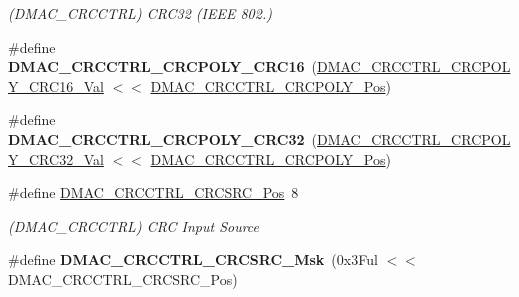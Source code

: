 \begin{DoxyCompactItemize}
\begin{DoxyCompactList}\small\item\em (D\+M\+A\+C\+\_\+\+C\+R\+C\+C\+T\+R\+L) C\+R\+C32 (I\+E\+E\+E 802.) \end{DoxyCompactList}\item 
\hypertarget{group___s_a_m_l21___d_m_a_c_ga471087616e9f20ccadbf347424f80de0}{}\#define {\bfseries D\+M\+A\+C\+\_\+\+C\+R\+C\+C\+T\+R\+L\+\_\+\+C\+R\+C\+P\+O\+L\+Y\+\_\+\+C\+R\+C16}~(\hyperlink{group___s_a_m_l21___d_m_a_c_gab7a571f0737b3094278178b68b70b75f}{D\+M\+A\+C\+\_\+\+C\+R\+C\+C\+T\+R\+L\+\_\+\+C\+R\+C\+P\+O\+L\+Y\+\_\+\+C\+R\+C16\+\_\+\+Val} $<$$<$ \hyperlink{group___s_a_m_l21___d_m_a_c_ga97c64ee6ae79fa28bef8e734380d31ee}{D\+M\+A\+C\+\_\+\+C\+R\+C\+C\+T\+R\+L\+\_\+\+C\+R\+C\+P\+O\+L\+Y\+\_\+\+Pos})\label{group___s_a_m_l21___d_m_a_c_ga471087616e9f20ccadbf347424f80de0}

\item 
\hypertarget{group___s_a_m_l21___d_m_a_c_gaa69d1bd9b5d9651b468708185004b1fa}{}\#define {\bfseries D\+M\+A\+C\+\_\+\+C\+R\+C\+C\+T\+R\+L\+\_\+\+C\+R\+C\+P\+O\+L\+Y\+\_\+\+C\+R\+C32}~(\hyperlink{group___s_a_m_l21___d_m_a_c_ga227b0d7a03589588e6f3234fba814b5a}{D\+M\+A\+C\+\_\+\+C\+R\+C\+C\+T\+R\+L\+\_\+\+C\+R\+C\+P\+O\+L\+Y\+\_\+\+C\+R\+C32\+\_\+\+Val} $<$$<$ \hyperlink{group___s_a_m_l21___d_m_a_c_ga97c64ee6ae79fa28bef8e734380d31ee}{D\+M\+A\+C\+\_\+\+C\+R\+C\+C\+T\+R\+L\+\_\+\+C\+R\+C\+P\+O\+L\+Y\+\_\+\+Pos})\label{group___s_a_m_l21___d_m_a_c_gaa69d1bd9b5d9651b468708185004b1fa}

\item 
\hypertarget{group___s_a_m_l21___d_m_a_c_gadc538250fa40a515d90fc7bbde4c5f83}{}\#define \hyperlink{group___s_a_m_l21___d_m_a_c_gadc538250fa40a515d90fc7bbde4c5f83}{D\+M\+A\+C\+\_\+\+C\+R\+C\+C\+T\+R\+L\+\_\+\+C\+R\+C\+S\+R\+C\+\_\+\+Pos}~8\label{group___s_a_m_l21___d_m_a_c_gadc538250fa40a515d90fc7bbde4c5f83}

\begin{DoxyCompactList}\small\item\em (D\+M\+A\+C\+\_\+\+C\+R\+C\+C\+T\+R\+L) C\+R\+C Input Source \end{DoxyCompactList}\item 
\hypertarget{group___s_a_m_l21___d_m_a_c_ga591cb2c9938ec947f4e8df095b8f7c75}{}\#define {\bfseries D\+M\+A\+C\+\_\+\+C\+R\+C\+C\+T\+R\+L\+\_\+\+C\+R\+C\+S\+R\+C\+\_\+\+Msk}~(0x3\+Ful $<$$<$ D\+M\+A\+C\+\_\+\+C\+R\+C\+C\+T\+R\+L\+\_\+\+C\+R\+C\+S\+R\+C\+\_\+\+Pos)\label{group___s_a_m_l21___d_m_a_c_ga591cb2c9938ec947f4e8df095b8f7c75}


\end{DoxyCompactItemize}
